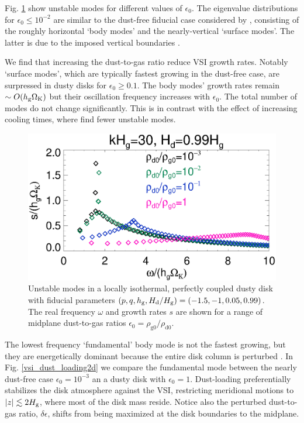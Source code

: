Fig. \ref{vsi_dust_loading} show unstable
modes for different values of $\epsilon_0$. The eigenvalue
distributions for $\epsilon_0 \leq 10^{-2}$ are similar to the
dust-free fiducial case considered by , consisting
of the roughly horizontal `body modes' and the nearly-vertical
`surface modes'. The latter is due to the imposed vertical boundaries
\citep{barker15}.  

We find that increasing the dust-to-gas ratio reduce VSI growth
rates. Notably `surface modes', which are typically fastest growing in
the dust-free case, are surpressed in dusty disks for $\epsilon_0\geq
0.1$. The body modes' growth rates remain $\sim O(h_\mathrm{g}\Omega_{\rm K})$
but their oscillation frequency increases with
$\epsilon_0$. The total number of modes do not change
significantly. This is in contrast with the effect of increasing
cooling times, where  find fewer unstable modes.

\begin{figure}
  \includegraphics[width=\linewidth]{figures/compare_eigenvals_kx30Hd1} 
  \caption{Unstable modes in a locally isothermal, perfectly coupled
    dusty disk with fiducial parameters
    $(p,q,h_\mathrm{g}, H_\mathrm{d}/H_\mathrm{g} )=(-1.5,-1,0.05, 0.99)$. The real
    frequency $\omega$ and growth rates $s$ are shown for a range of
    midplane dust-to-gas ratios $\epsilon_0=\rho_\mathrm{g0}/\rho_\mathrm{d0}$. 
    \label{vsi_dust_loading}
    }
\end{figure}

The lowest frequency `fundamental' body mode is not the fastest
growing, but they are energetically dominant because the entire disk
column is perturbed \citep[cf. surface modes which only disturb the
  disk boundaries,][]{umurhan16c}. In Fig. \ref{vsi_dust_loading2d}
we compare the fundamental mode between the nearly 
dust-free case $\epsilon_0=10^{-3}$ an a dusty disk with
$\epsilon_0=1$. Dust-loading preferentially
stabilizes the disk atmosphere against the VSI, restricting
meridional motions to $|z|\lesssim 2H_\mathrm{g}$, where most of the disk mass
reside. Notice also the perturbed dust-to-gas ratio,
$\delta\epsilon$, shifts from being maximized at the disk boundaries
to the midplane. 

